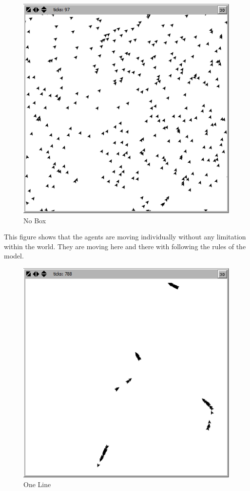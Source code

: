 \documentclass{article}
\begin{document}
\begin{figure}[H]
  \includegraphics[width=\linewidth]{boxna.png}
  \caption{No Box}
\end{figure}


This figure shows that the agents are moving individually without any limitation within the world. They are moving here and there with following the rules of the model.
 



\begin{figure}[H]
  \includegraphics[width=\linewidth]{oneline.png}
  \caption{One Line}
 
\end{figure}
\end{document}
